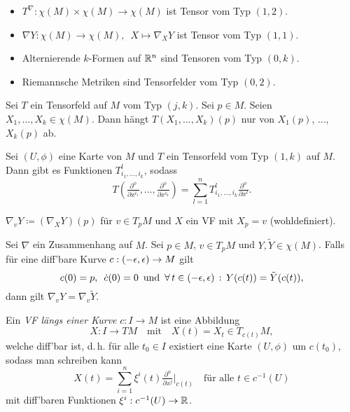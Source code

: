 \documentclass{cheat-sheet}
\newcommand{\coord}[1]{\tfrac{\partial^\phi}{\partial x^{#1}}} %
\begin{document}
\begin{bspe}
  \begin{itemize}
    \item $T^\nabla : \chi(M) \times \chi(M) \to \chi(M)$ ist Tensor vom Typ $(1, 2)$.
    \item $\nabla Y : \chi(M) \to \chi(M), \enspace X \mapsto \nabla_X Y$ ist Tensor vom Typ $(1, 1)$.
    \item Alternierende $k$-Formen auf $\mathbb{R}^n$ sind Tensoren vom Typ $(0, k)$.
    \item Riemannsche Metriken sind Tensorfelder vom Typ $(0, 2)$.
  \end{itemize}
\end{bspe}

\begin{satz}
  Sei $T$ ein Tensorfeld auf $M$ vom Typ $(j, k)$. Sei $p \in M$. Seien $X_1, ..., X_k \in \chi(M)$. Dann hängt $T(X_1, ..., X_k)(p)$ nur von $X_1(p)$, ..., $X_k(p)$ ab.
\end{satz}


\begin{bem}
  Sei $(U, \phi)$ eine Karte von $M$ und $T$ ein Tensorfeld vom Typ $(1, k)$ auf $M$. Dann gibt es Funktionen $T_{i_1,...,i_k}^l$, sodass
  \[ T(\coord{i_1}, ..., \coord{i_k}) = \sum_{l=1}^n T_{i_1,...,i_k}^l \coord{l}. \]
\end{bem}

\begin{nota}
  $\nabla_v Y \coloneqq (\nabla_X Y)(p)$ für $v \in T_p M$ und $X$ ein VF mit $X_p = v$ (wohldefiniert).
\end{nota}

\begin{satz}
  Sei $\nabla$ ein Zusammenhang auf $M$. Sei $p \in M$, $v \in T_p M$ und $Y, \tilde{Y} \in \chi(M)$. Falls für eine diff'bare Kurve $c : \left( -\epsilon, \epsilon \right) \to M$ gilt
  \[
    c(0) = p, \enspace
    \dot{c}(0) = 0 \enspace \text{und} \enspace
    \forall \, {t \in \left( -\epsilon, \epsilon \right)} \,:\, Y(c(t)) = \tilde{Y}(c(t)),
  \]
  dann gilt $\nabla_v Y = \nabla_v \tilde{Y}$.
\end{satz}


\begin{defn}
  Ein \emph{VF längs einer Kurve} $c : I \to M$ ist eine Abbildung
  \[
    X : I \to TM
    \quad \text{mit} \quad
    X(t) = X_t \in T_{c(t)} M,
  \]
  welche diff'bar ist, d.\,h. für alle $t_0 \in I$ existiert eine Karte $(U, \phi)$ um $c(t_0)$, sodass man schreiben kann
  \[
    X(t) = \sum_{i=1}^n \xi^i(t) \coord{j}|_{c(t)} \quad \text{für alle } t \in c^{-1}(U)
  \]
  mit diff'baren Funktionen $\xi^i : c^{-1}(U) \to \mathbb{R}$.
\end{defn}
\end{document}
